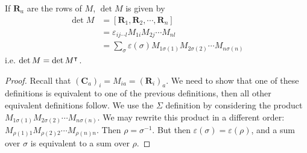 \documentclass{article}
\begin{document}
	\begin{proposition}
		If $\bm R_a$ are the rows of $M$, $\det M$ is given by
		\begin{align*}
			\det M
			&= [\bm R_1, \bm R_2, \cdots, \bm R_n] \\
			&= \varepsilon_{ij\cdots l}M_{1i}M_{2j} \cdots M_{nl} \\
			&= \sum_\sigma \varepsilon(\sigma) M_{1\sigma(1)}M_{2\sigma(2)} \cdots M_{n\sigma(n)}
		\end{align*}
		i.e. $\det M = \det M^\intercal$.
	\end{proposition}
	\begin{proof}
		Recall that $(\bm C_a)_i = M_{ia} = (\bm R_i)_a$. We need to show that one of these definitions is equivalent to one of the previous definitions, then all other equivalent definitions follow. We use the $\Sigma$ definition by considering the product $M_{1\sigma(1)}M_{2\sigma(2)} \cdots M_{n\sigma(n)}$. We may rewrite this product in a different order: $M_{\rho(1)1}M_{\rho(2)2} \cdots M_{\rho(n)n}$. Then $\rho = \sigma^{-1}$. But then $\varepsilon(\sigma) = \varepsilon(\rho)$, and a sum over $\sigma$ is equivalent to a sum over $\rho$.
	\end{proof}
\end{document}
